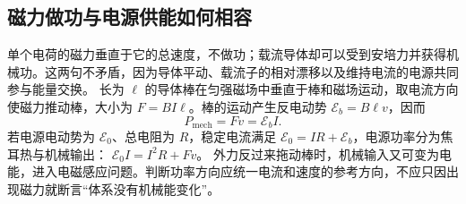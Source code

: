 \subsection{磁力做功与电源供能如何相容}
单个电荷的磁力垂直于它的总速度，不做功；载流导体却可以受到安培力并获得机械功。这两句不矛盾，因为导体平动、载流子的相对漂移以及维持电流的电源共同参与能量交换。
长为 $\ell$ 的导体棒在匀强磁场中垂直于棒和磁场运动，取电流方向使磁力推动棒，大小为 $F=BI\ell$。棒的运动产生反电动势 $\mathcal E_b=B\ell v$，因而
\[
 P_{\mathrm{mech}}=Fv=\mathcal E_b I.
\]
若电源电动势为 $\mathcal E_0$、总电阻为 $R$，稳定电流满足
$\mathcal E_0=IR+\mathcal E_b$，电源功率分为焦耳热与机械输出：
$\mathcal E_0I=I^2R+Fv$。
外力反过来拖动棒时，机械输入又可变为电能，进入电磁感应问题。判断功率方向应统一电流和速度的参考方向，不应只因出现磁力就断言“体系没有机械能变化”。

